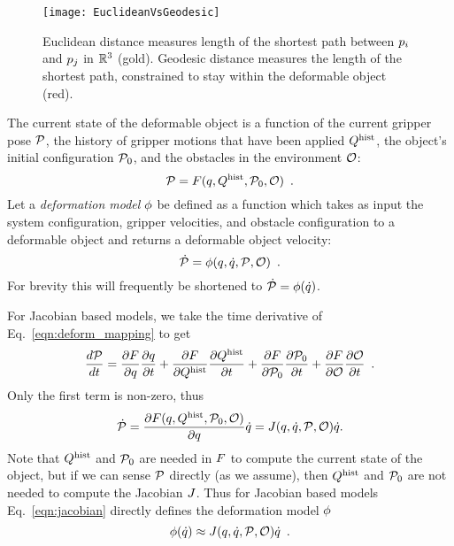 \begin{figure}[ht]
    \centering
    \texttt{[image: EuclideanVsGeodesic]}
    \caption{Euclidean distance measures length of the shortest path between $p_i$ and $p_j$ in $\mathbb{R}^3$ (gold). Geodesic distance measures the length of the shortest path, constrained to stay within the deformable object (red).}
    \label{fig:geodesic}
\end{figure}

The current state of the deformable object is a function of the current gripper pose $\mathcal{P}$, the history of gripper motions that have been applied $Q^{\textrm{hist}}$, the object's initial configuration $\mathcal{P}_0$, and the obstacles in the environment $\mathcal{O}$:
\begin{equation}
    \mathcal{P} = F(q, Q^{\textrm{hist}}, \mathcal{P}_0, \mathcal{O}) \enspace.
    \label{eqn:deform_mapping}
\end{equation}
Let a \textit{deformation model} $\phi$ be defined as a function which takes as input the system configuration, gripper velocities, and obstacle configuration to a deformable object and returns a deformable object velocity:
\begin{equation}
    \dot{\mathcal{P}} = \phi(q, \dot{q}, \mathcal{P}, \mathcal{O}) \enspace .
\end{equation}
For brevity this will frequently be shortened to $\dot{\mathcal{P}} = \phi(\dot{q})$.

For Jacobian based models, we take the time derivative of Eq.~\eqref{eqn:deform_mapping} to get
\begin{equation}
\frac{d \mathcal{P}}{d t} = 
    \frac{\partial F}{\partial q}  \frac{\partial q}{\partial t} + 
    \frac{\partial F}{\partial Q^{\textrm{hist}}}\frac{\partial Q^{\textrm{hist}}}{\partial t} + 
    \frac{\partial F}{\partial \mathcal{P}_0} \frac{\partial \mathcal{P}_0}{\partial t} +
    \frac{\partial F}{\partial \mathcal{O}}       \frac{\partial \mathcal{O}}{\partial t} \enspace .
\end{equation}
Only the first term is non-zero, thus
\begin{equation}
    \dot{\mathcal{P}} = \frac{\partial F(q, Q^{\textrm{hist}}, \mathcal{P}_0, \mathcal{O})}{\partial q} \dot{q} = J(q, \dot{q}, \mathcal{P}, \mathcal{O}) \dot{q}.
    \label{eqn:jacobian}
\end{equation}
Note that $Q^{\textrm{hist}}$ and $\mathcal{P}_0$ are needed in $F$ to compute the current state of the object, but if we can sense $\mathcal{P}$ directly (as we assume), then $Q^{\textrm{hist}}$ and $\mathcal{P}_0$ are not needed to compute the Jacobian $J$. Thus for Jacobian based models Eq.~\eqref{eqn:jacobian} directly defines the deformation model $\phi$
\begin{equation}
    \phi(\dot{q}) \approx J(q, \dot{q}, \mathcal{P}, \mathcal{O}) \dot{q} \enspace.
    \label{eqn:jacobianforwardfunction}
\end{equation}

